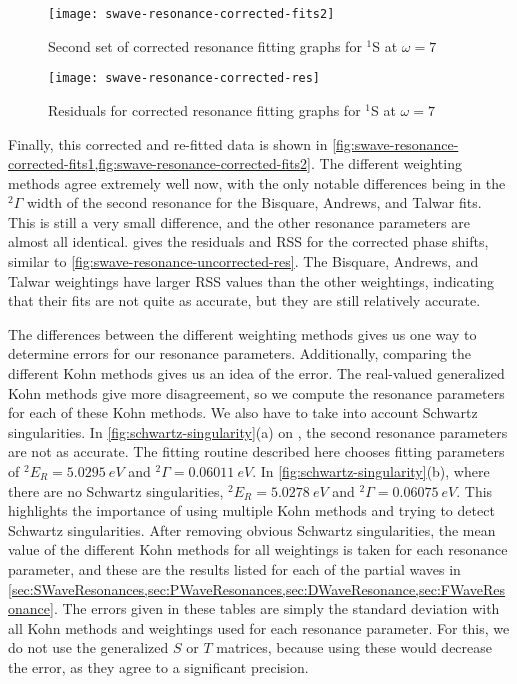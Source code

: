 \documentclass[Dissertation.tex]{subfiles}
\begin{document}
\begin{figure}
	\centering
	\texttt{[image: swave-resonance-corrected-fits2]}
	\caption{Second set of corrected resonance fitting graphs for $^1$S at $\omega = 7$}
	\label{fig:swave-resonance-corrected-fits2}
\end{figure}

\begin{figure}
	\centering
	\texttt{[image: swave-resonance-corrected-res]}
	\caption{Residuals for corrected resonance fitting graphs for $^1$S at $\omega = 7$}
	\label{fig:swave-resonance-corrected-res}
\end{figure}

Finally, this corrected and re-fitted data is shown in
\cref{fig:swave-resonance-corrected-fits1,fig:swave-resonance-corrected-fits2}. The different 
weighting methods agree extremely well now, with the only notable differences 
being in the $^2\Gamma$ width of the second resonance for the Bisquare, 
Andrews, and Talwar fits. This is still a very small difference, and the 
other resonance parameters are almost all identical.
 gives the residuals and RSS for the corrected phase
shifts, similar to \cref{fig:swave-resonance-uncorrected-res}. The Bisquare, Andrews, 
and Talwar weightings have larger RSS values than the other weightings, 
indicating that their fits are not quite as accurate, but they are still 
relatively accurate.

The differences between the different weighting methods gives us one way to 
determine errors for our resonance parameters. Additionally, comparing the 
different Kohn methods gives us an idea of the error. The real-valued 
generalized Kohn methods give more disagreement, so we compute the resonance 
parameters for each of these Kohn methods. We also have to take into account 
Schwartz singularities. In \cref{fig:schwartz-singularity}(a) on
\pageref{fig:schwartz-singularity}, the second resonance parameters are not as 
accurate. The fitting routine described here chooses fitting parameters of
$^2E_R = \SI{5.0295}{eV}$ and $^2\Gamma = \SI{0.06011}{eV}$.
In \cref{fig:schwartz-singularity}(b), where there are no Schwartz 
singularities, $^2E_R = \SI{5.0278}{eV}$ and $^2\Gamma = \SI{0.06075}{eV}$. 
This highlights the importance of using multiple Kohn methods and trying to 
detect Schwartz singularities. After removing obvious Schwartz singularities, 
the mean value of the different Kohn methods for all weightings is taken for 
each resonance parameter, and these are the results listed for each of the 
partial waves in
\cref{sec:SWaveResonances,sec:PWaveResonances,sec:DWaveResonance,sec:FWaveResonance}.
The errors given in these tables are simply the standard deviation with all 
Kohn methods and weightings used for each resonance parameter. For this, we 
do not use the generalized $S$ or $T$ matrices, because using these would 
decrease the error, as they agree to a significant precision.




\biblio
\end{document}
